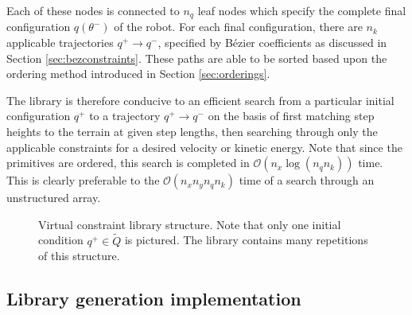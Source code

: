 Each of these nodes is connected to $n_q$ leaf nodes which specify the complete final configuration $q(\theta^-)$ of the robot. For each final configuration, there are $n_k$ applicable trajectories $q^+ \to q^-$, specified by Bézier coefficients as discussed in Section \ref{sec:bezconstraints}. These paths are able to be sorted based upon the ordering method introduced in Section \ref{sec:orderings}.

The library is therefore conducive to an efficient search from a particular initial configuration $q^+$ to a trajectory $q^+ \to q^-$ on the basis of first matching step heights to the terrain at given step lengths, then searching through only the applicable constraints for a desired velocity or kinetic energy. Note that since the primitives are ordered, this search is completed in $\mathcal{O}(n_x\log(n_qn_k))$ time. This is clearly preferable to the $\mathcal{O}(n_xn_yn_qn_k)$ time of a search through an unstructured array.

\begin{figure}
	\centering
	\caption[Virtual constraint library structure]{Virtual constraint library structure. Note that only  one initial condition $q^+\in\tilde{Q}$ is pictured. The library contains many repetitions of this structure.}
\end{figure}
\subsection{Library generation implementation}
